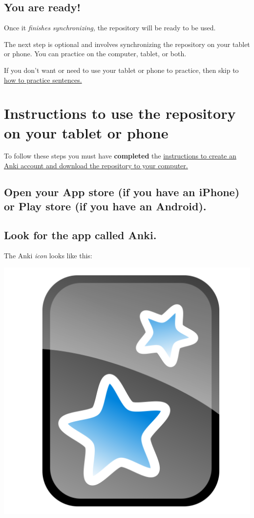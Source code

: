 \documentclass[
]{book}
\begin{document}
\hypertarget{you-are-ready}{%
\section{You are ready!}\label{you-are-ready}}

Once it \emph{finishes synchronizing,} the repository will be ready to be used.

The next step is optional and involves synchronizing the repository on your tablet or phone. You can practice on the computer, tablet, or both.

If you don't want or need to use your tablet or phone to practice, then skip to \protect\hyperlink{cross_5}{how to practice sentences.}

\hypertarget{instructions-to-use-the-repository-on-your-tablet-or-phone}{%
\chapter{Instructions to use the repository on your tablet or phone}\label{instructions-to-use-the-repository-on-your-tablet-or-phone}}

To follow these steps you must have \textbf{completed} the \protect\hyperlink{cross_3}{instructions to create an Anki account and download the repository to your computer.}

\hypertarget{open-your-app-store-if-you-have-an-iphone-or-play-store-if-you-have-an-android.}{%
\section{Open your App store (if you have an iPhone) or Play store (if you have an Android).}\label{open-your-app-store-if-you-have-an-iphone-or-play-store-if-you-have-an-android.}}

\hypertarget{look-for-the-app-called-anki.}{%
\section{Look for the app called Anki.}\label{look-for-the-app-called-anki.}}

The Anki \emph{icon} looks like this:

\includegraphics[width=0.5\linewidth]{images/reposit_en/Anki_logo}
\end{document}
